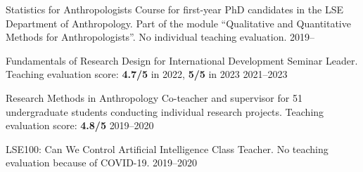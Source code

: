 



\begin{cvexperiences}

\nopagebreak
  \cvexperience
    {Statistics for Anthropologists} %
    {Course for first-year PhD candidates in the LSE Department of Anthropology. Part of the module ``Qualitative and Quantitative Methods for Anthropologists''. No individual teaching evaluation.} %
    {2019--} %

\end{cvexperiences}


\begin{cvexperiences}
  \cvexperience
    {Fundamentals of Research Design for International Development} %
    {Seminar Leader. Teaching evaluation score: \textbf{4.7/5} in 2022, \textbf{5/5} in 2023} %
    {2021--2023} %

  \cvexperience
    {Research Methods in Anthropology} %
    {Co-teacher and supervisor for 51 undergraduate students conducting individual research projects. Teaching evaluation score: \textbf{4.8/5}} %
    {2019--2020} %

  \cvexperience
    {LSE100: Can We Control Artificial Intelligence} %
    {Class Teacher. No teaching evaluation because of COVID-19.} %
    {2019--2020} %

\end{cvexperiences}

